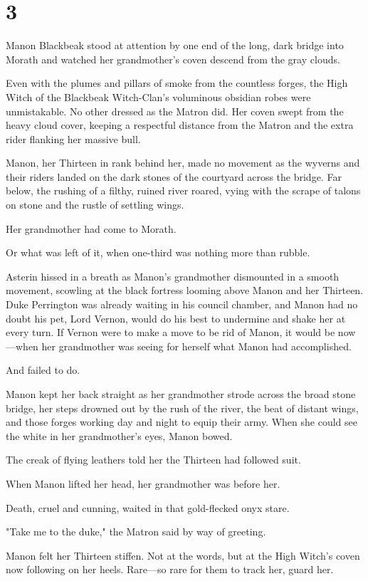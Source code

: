 
\chapter{3}

Manon Blackbeak stood at attention by one end of the long, dark bridge into Morath and watched her grandmother's coven descend from the gray clouds.

Even with the plumes and pillars of smoke from the countless forges, the High Witch of the Blackbeak Witch-Clan's voluminous obsidian robes were unmistakable. No other dressed as the Matron did. Her coven swept from the heavy cloud cover, keeping a respectful distance from the Matron and the extra rider flanking her massive bull.

Manon, her Thirteen in rank behind her, made no movement as the wyverns and their riders landed on the dark stones of the courtyard across the bridge. Far below, the rushing of a filthy, ruined river roared, vying with the scrape of talons on stone and the rustle of settling wings.

Her grandmother had come to Morath.

Or what was left of it, when one-third was nothing more than rubble.

Asterin hissed in a breath as Manon's grandmother dismounted in a smooth movement, scowling at the black fortress looming above Manon and her Thirteen. Duke Perrington was already waiting in his council chamber, and Manon had no doubt his pet, Lord Vernon, would do his best to undermine and shake her at every turn. If Vernon were to make a move to be rid of Manon, it would be now---when her grandmother was seeing for herself what Manon had accomplished.

And failed to do.

Manon kept her back straight as her grandmother strode across the broad stone bridge, her steps drowned out by the rush of the river, the beat of distant wings, and those forges working day and night to equip their army. When she could see the white in her grandmother's eyes, Manon bowed.

The creak of flying leathers told her the Thirteen had followed suit.

When Manon lifted her head, her grandmother was before her.

Death, cruel and cunning, waited in that gold-flecked onyx stare.

"Take me to the duke," the Matron said by way of greeting.

Manon felt her Thirteen stiffen. Not at the words, but at the High Witch's coven now following on her heels. Rare---so rare for them to track her, guard her.

